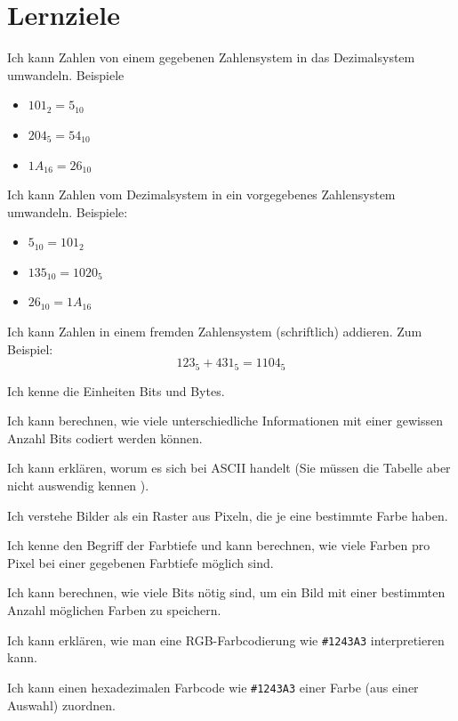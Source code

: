 \chapter{Lernziele}
\begin{todolist}
\item Ich kann Zahlen von einem gegebenen Zahlensystem in das Dezimalsystem umwandeln. Beispiele
\begin{itemize}
\item $101_2 = 5_{10}$
\item $204_5 = 54_{10}$
\item $1A_{16} = 26_{10}$
\end{itemize}
\item Ich kann Zahlen vom Dezimalsystem in ein vorgegebenes Zahlensystem umwandeln. Beispiele:
\begin{itemize}
\item $5_{10} = 101_2$
\item $135_{10}=1020_5$
\item $26_{10}=1A_{16}$
\end{itemize}
\item Ich kann Zahlen in einem fremden Zahlensystem (schriftlich) addieren. Zum Beispiel:
\[123_5 + 431_5 = 1104_5\]
\item Ich kenne die Einheiten Bits und Bytes.
\item Ich kann berechnen, wie viele unterschiedliche Informationen mit einer gewissen Anzahl Bits codiert werden können.
\item Ich kann erklären, worum es sich bei ASCII handelt (Sie müssen die Tabelle aber nicht auswendig kennen ).
\item Ich verstehe Bilder als ein Raster aus Pixeln, die je eine bestimmte Farbe haben.
\item Ich kenne den Begriff der Farbtiefe und kann berechnen, wie viele Farben pro Pixel bei einer gegebenen Farbtiefe möglich sind.
\item Ich kann berechnen, wie viele Bits nötig sind, um ein Bild mit einer bestimmten Anzahl möglichen Farben zu speichern.
\item Ich kann erklären, wie man eine RGB-Farbcodierung wie \texttt{\#1243A3} interpretieren kann.
\item Ich kann einen hexadezimalen Farbcode wie \texttt{\#1243A3} einer Farbe (aus einer Auswahl) zuordnen.
\end{todolist}
